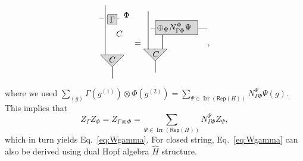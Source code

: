 \documentclass[a4paper,11pt]{article}
\theoremstyle{theorem}
\theoremstyle{remark}
\newcommand{\Rep}{\mathsf{Rep}}
\newcommand{\cone}{(1)}
\newcommand{\ctwo}{(2)}
\newcommand{\Irr}{\operatorname{Irr}}
\begin{document}
\begin{equation}
\begin{aligned}
\begin{tikzpicture}
         \draw[fill=gray!30]  (-0.3,-1.1) -- (0.7,-1.1) -- (0.2,-1.6) -- cycle;
         \draw[line width=.6pt,black] (-0.1,-1.1)--(-0.1,1);
           \draw[black,fill=gray!30] (0,.2) rectangle ++(0.4,0.4); 
          \draw[line width=.6pt,black,gray] (0.4,0.45)--(0.5,0.45);
        \draw[line width=.6pt,black,gray] (0,0.45)--(-0.05,0.45);
                \draw[line width=.6pt,black,gray] (-0.15,0.45)--(-0.35,0.45);
             \draw[line width=.6pt,black] (0.2,-1.6)--(0.2,-2.1);
            \node[ line width=0.6pt, dashed, draw opacity=0.5] (a) at (0.8,0.6){$\Phi$};
            \node[ line width=0.6pt, dashed, draw opacity=0.5] (a) at (0.2,0.4){$\Gamma$};
          \node at (0.5, -0.2) {$ C$};
                   \node at (0.2, -1.3) {$ C$}; 
        \end{tikzpicture}
    \end{aligned}
    =\begin{aligned}
        \begin{tikzpicture}
           \draw[line width=.6pt,black] (0.5,-0.5)--(0.5,-1.1); 
           \draw[line width=.6pt,black,gray] (0.2,-0.25)--(0,-0.25);
            \draw[line width=.6pt,black,gray] (2,-0.25)--(2.4,-0.25);
         \draw[fill=gray!30]  (-0.3,-1.1) -- (0.7,-1.1) -- (0.2,-1.6) -- cycle;
         \draw[line width=.6pt,black] (-0.1,-1.1)--(-0.1,0.5);
           \draw[black,fill=gray!30] (0.2,-.5) rectangle ++(1.8,0.6); 
             \draw[line width=.6pt,black] (0.2,-1.6)--(0.2,-2.1);
             \node at (0.23, -1.32) {$ C$}; 
              \node[ line width=0.6pt, dashed, draw opacity=0.5] (a) at (1,-0.2){$\oplus_{\Psi}N_{\Gamma\Phi}^{\Psi}\Psi$};
        \end{tikzpicture}
    \end{aligned},
\end{equation}
where we used $\sum_{(g)}\Gamma(g^{\cone})\otimes \Phi(g^{\ctwo})=\sum_{\Psi\in \Irr(\Rep(H))} N_{\Gamma \Phi}^{\Psi} \Psi(g)$.
This implies that 
\begin{equation}
    Z_{\Gamma}Z_{\Phi}=Z_{\Gamma \otimes \Phi}=\sum_{\Psi\in \Irr(\Rep(H))} N_{\Gamma \Phi}^{\Psi} Z_{\Psi},
\end{equation}
which in turn yields Eq.~\eqref{eq:Wgamma}. For closed string, Eq.~\eqref{eq:Wgamma} can also be derived using dual Hopf algebra $\hat{H}$ structure.
\end{document}
